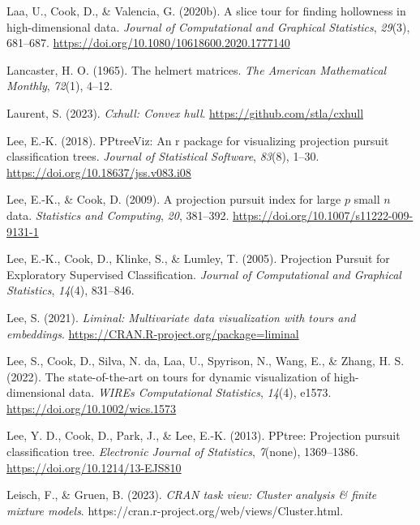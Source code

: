 \documentclass[
  letterpaper,
]{krantz}
\newlength{\cslhangindent}
\newlength{\cslentryspacingunit} %
\newenvironment{CSLReferences}[2] %
 {%
  \setlength{\parindent}{0pt}
  \ifodd #1
  \let\oldpar\par
  \def\par{\hangindent=\cslhangindent\oldpar}
  \fi
  \setlength{\parskip}{#2\cslentryspacingunit}
 }%
 {}
\begin{document}
\begin{CSLReferences}{1}{0}
\leavevmode{}%
Laa, U., Cook, D., \& Valencia, G. (2020b). A slice tour for finding
hollowness in high-dimensional data. \emph{Journal of Computational and
Graphical Statistics}, \emph{29}(3), 681--687.
\url{https://doi.org/10.1080/10618600.2020.1777140}

\leavevmode{}%
Lancaster, H. O. (1965). The helmert matrices. \emph{The American
Mathematical Monthly}, \emph{72}(1), 4--12.

\leavevmode{}%
Laurent, S. (2023). \emph{Cxhull: Convex hull}.
\url{https://github.com/stla/cxhull}

\leavevmode{}%
Lee, E.-K. (2018). PPtreeViz: An r package for visualizing projection
pursuit classification trees. \emph{Journal of Statistical Software},
\emph{83}(8), 1--30. \url{https://doi.org/10.18637/jss.v083.i08}

\leavevmode{}%
Lee, E.-K., \& Cook, D. (2009). A projection pursuit index for large
\(p\) small \(n\) data. \emph{Statistics and Computing}, \emph{20},
381--392. \url{https://doi.org/10.1007/s11222-009-9131-1}

\leavevmode{}%
Lee, E.-K., Cook, D., Klinke, S., \& Lumley, T. (2005). {P}rojection
{P}ursuit for {E}xploratory {S}upervised {C}lassification. \emph{Journal
of Computational and Graphical Statistics}, \emph{14}(4), 831--846.

\leavevmode{}%
Lee, S. (2021). \emph{Liminal: Multivariate data visualization with
tours and embeddings}. \url{https://CRAN.R-project.org/package=liminal}

\leavevmode{}%
Lee, S., Cook, D., Silva, N. da, Laa, U., Spyrison, N., Wang, E., \&
Zhang, H. S. (2022). The state-of-the-art on tours for dynamic
visualization of high-dimensional data. \emph{WIREs Computational
Statistics}, \emph{14}(4), e1573.
\url{https://doi.org/10.1002/wics.1573}

\leavevmode{}%
Lee, Y. D., Cook, D., Park, J., \& Lee, E.-K. (2013). {PPtree:
Projection pursuit classification tree}. \emph{Electronic Journal of
Statistics}, \emph{7}(none), 1369--1386.
\url{https://doi.org/10.1214/13-EJS810}

\leavevmode{}%
Leisch, F., \& Gruen, B. (2023). \emph{CRAN task view: Cluster analysis
\& finite mixture models}.
https://cran.r-project.org/web/views/Cluster.html.


\end{CSLReferences}
\end{document}
